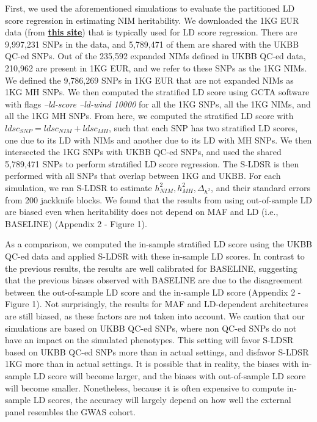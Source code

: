 First, we used the aforementioned simulations to evaluate the partitioned LD score regression in estimating NIM heritability. We downloaded the 1KG EUR data (from \hyperlink{https://storage.googleapis.com/broad-alkesgroup-public/LDSCORE/1000G_Phase3_plinkfiles.tgz}{\textbf{this site}}) that is typically used for LD score regression. There are 9,997,231 SNPs in the data, and 5,789,471 of them are shared with the UKBB QC-ed SNPs. Out of the 235,592 expanded NIMs defined in UKBB QC-ed data, 210,962 are present in 1KG EUR, and we refer to these SNPs as the 1KG NIMs. We defined the 9,786,269 SNPs in 1KG EUR that are not expanded NIMs as 1KG MH SNPs. We then computed the stratified LD score using GCTA software with flags \textit{--ld-score --ld-wind 10000} for all the 1KG SNPs, all the 1KG NIMs, and all the 1KG MH SNPs. From here, we computed the stratified LD score with $ldsc_{SNP} = ldsc_{NIM} + ldsc_{MH}$, such that each SNP has two stratified LD scores, one due to its LD with NIMs and another due to its LD with MH SNPs. We then intersected the 1KG SNPs with UKBB QC-ed SNPs, and used the shared 5,789,471 SNPs to perform stratified LD score regression. The S-LDSR is then performed with all SNPs that overlap between 1KG and UKBB. For each simulation, we ran S-LDSR to estimate $h_{NIM}^2, h_{MH}^2, \Delta_{h^2}$, and their standard errors from 200 jackknife blocks. We found that the results from using out-of-sample LD are biased even when heritability does not depend on  MAF and LD (i.e., BASELINE) (Appendix 2 - Figure 1). 

As a comparison, we computed the in-sample stratified LD score using the UKBB QC-ed data and applied S-LDSR with these in-sample LD scores. In contrast to the previous results, the results are well calibrated for BASELINE, suggesting that the previous biases observed with BASELINE are due to the disagreement between the out-of-sample LD score and the in-sample LD score (Appendix 2 - Figure 1). Not surprisingly, the results for MAF and LD-dependent architectures are still biased, as these factors are not taken into account. We caution that our simulations are based on UKBB QC-ed SNPs, where non QC-ed SNPs do not have an impact on the simulated phenotypes. This setting will favor S-LDSR based on UKBB QC-ed SNPs more than in actual settings, and disfavor S-LDSR 1KG more than in actual settings. It is possible that in reality, the biases with in-sample LD score will become larger, and the biases with out-of-sample LD score will become smaller. Nonetheless, because it is often expensive to compute in-sample LD scores, the accuracy will largely depend on how well the external panel resembles the GWAS cohort. 

